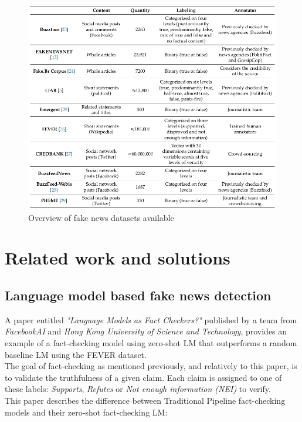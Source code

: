 \documentclass[10pt, english]{report}
\begin{document}
\begin{figure}[H]
	\centering
	\includegraphics[scale=0.53]{img/datasets_comparison.png}
	\caption{Overview of fake news datasets available \cite{de2021identifying}}
\end{figure}


\chapter{Related work and solutions}
\section{Language model based fake news detection \cite{lee2020language} \cite{petroni2019language}}
A paper entitled \textit{"Language Models as Fact Checkers?"} published by a team from \textit{FacebookAI} and \textit{Hong Kong University of Science and Technology}, provides an example of a fact-checking model using zero-shot LM that outperforms a random baseline LM using the FEVER dataset\cite{thorne2018fever}.\\

The goal of fact-checking as mentioned previously, and relatively to this paper, is to validate the truthfulness of a given claim. Each claim is assigned to one of these labels: \textit{Supports}, \textit{Refutes} or \textit{Not enough information (NEI)} to verify.\\

This paper describes the difference between Traditional Pipeline fact-checking models and their zero-shot fact-checking LM:
\end{document}
